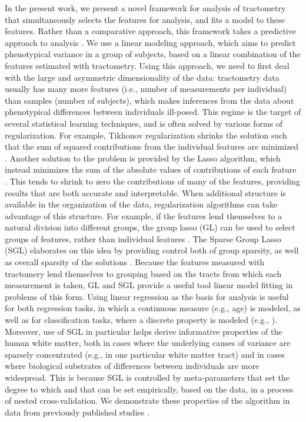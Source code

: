 In the present work, we present a novel framework for analysis of tractometry
that simultaneously selects the features for analysis, and fits a model to these
features. Rather than a comparative approach, this framework takes a predictive
approach to analysis \cite{Yarkoni2017-bi}. We use a linear modeling approach,
which aims to predict phenotypical variance in a group of subjects, based on a
linear combination of the features estimated with tractometry. Using this
approach, we need to first deal with the large and asymmetric dimensionality of
the data: tractometry data usually has many more features (i.e., number of
measurements per individual) than samples (number of subjects), which makes
inferences from the data about phenotypical differences between individuals
ill-posed. This regime is the target of several statistical learning techniques,
and is often solved by various forms of regularization. For example, Tikhonov
regularization shrinks the solution such that the sum of squared contributions
from the individual features are minimized \cite{Hoerl2000-ij}. Another solution
to the problem is provided by the Lasso algorithm, which instead minimizes the
sum of the absolute values of contributions of each feature
\cite{Tibshirani1996-qs}. This tends to shrink to zero the contributions of many
of the features, providing results that are both accurate and interpretable.
When additional structure is available in the organization of the data,
regularization algorithms can take advantage of this structure. For example, if
the features lend themselves to a natural division into different groups, the
group lasso (GL) can be used to select groups of features, rather than
individual features \cite{Yuan2006-ky}. The Sparse Group Lasso (SGL) elaborates
on this idea by providing control both of group sparsity, as well as overall
sparsity of the solutions \cite{simon2013sgl}. Because the features measured
with tractomery lend themselves to grouping based on the tracts from which each
measurement is taken, GL and SGL provide a useful tool linear model fitting in
problems of this form. Using linear regression as the basis for analysis is
useful for both regression tasks, in which a continuous measure (e.g., age) is
modeled, as well as for classification tasks, where a discrete property is
modeled (e.g., ). Moreover, use of SGL in particular helps derive informative
properties of the human white matter, both in cases where the underlying causes
of variance are sparsely concentrated (e.g., in one particular white matter
tract) and in cases where biological substrates of differences between
individuals are more widespread. This is because SGL is controlled by
meta-parameters that set the degree to  which and that can be set empirically,
based on the data, in a process of nested cross-validation. We demonstrate these
properties of the algorithm in data from previously published studies
\cite{sarica2017corticospinal, yeatman2014lifespan}.
